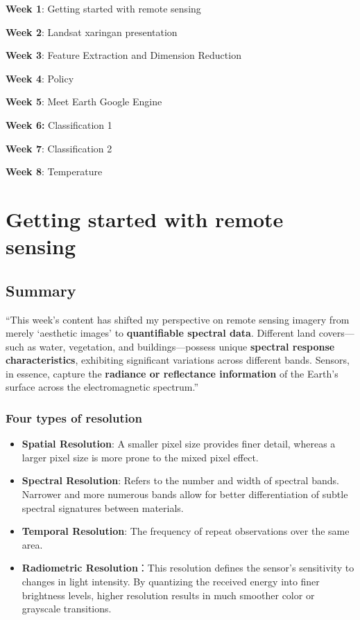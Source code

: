 \documentclass[
  letterpaper,
  DIV=11,
  numbers=noendperiod]{scrreprt}
\begin{document}
\textbf{Week 1}: Getting started with remote sensing

\textbf{Week 2}: Landsat xaringan presentation

\textbf{Week 3}: Feature Extraction and Dimension Reduction

\textbf{Week 4}: Policy

\textbf{Week 5}: Meet Earth Google Engine

\textbf{Week 6:} Classification 1

\textbf{Week 7}: Classification 2

\textbf{Week 8}: Temperature


\chapter{Getting started with remote
sensing}\label{getting-started-with-remote-sensing}

\section{Summary}\label{summary}

``This week's content has shifted my perspective on remote sensing
imagery from merely `aesthetic images' to \textbf{quantifiable spectral
data}. Different land covers---such as water, vegetation, and
buildings---possess unique \textbf{spectral response characteristics},
exhibiting significant variations across different bands. Sensors, in
essence, capture the \textbf{radiance or reflectance information} of the
Earth's surface across the electromagnetic spectrum.''

\subsection{Four types of resolution}\label{four-types-of-resolution}

\begin{itemize}
\item
  \textbf{Spatial Resolution}: A smaller pixel size provides finer
  detail, whereas a larger pixel size is more prone to the mixed pixel
  effect.
\item
  \textbf{Spectral Resolution}: Refers to the number and width of
  spectral bands. Narrower and more numerous bands allow for better
  differentiation of subtle spectral signatures between materials.
\item
  \textbf{Temporal Resolution}: The frequency of repeat observations
  over the same area.
\item
  \textbf{Radiometric Resolution}：This resolution defines the sensor's
  sensitivity to changes in light intensity. By quantizing the received
  energy into finer brightness levels, higher resolution results in much
  smoother color or grayscale transitions.
\end{itemize}
\end{document}

